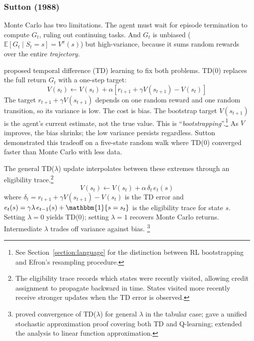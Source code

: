 \subsubsection{Sutton (1988)}

Monte Carlo has two limitations. The agent must wait for episode termination to compute $G_t$, ruling out continuing tasks. And $G_t$ is unbiased ($\mathbb{E}[G_t \mid S_t = s] = V^\pi(s)$) but high-variance, because it sums random rewards over the entire \textit{trajectory}.

\citet{sutton1988} proposed temporal difference (TD) learning to fix both problems. TD(0) replaces the full return $G_t$ with a one-step target:
\begin{equation}
V(s_t) \leftarrow V(s_t) + \alpha \left[ r_{t+1} + \gamma V(s_{t+1}) - V(s_t) \right]
\end{equation}
The target $r_{t+1} + \gamma V(s_{t+1})$ depends on one random reward and one random transition, so its variance is low. The cost is bias. The bootstrap target $V(s_{t+1})$ is the agent's current estimate, not the true value. This is ``\textit{bootstrapping}''.\footnote{See Section~\ref{section:language} for the distinction between RL bootstrapping and Efron's resampling procedure.} As $V$ improves, the bias shrinks; the low variance persists regardless. Sutton demonstrated this tradeoff on a five-state random walk where TD(0) converged faster than Monte Carlo with less data.

The general TD($\lambda$) update interpolates between these extremes through an eligibility trace.\footnote{The eligibility trace records which states were recently visited, allowing credit assignment to propagate backward in time. States visited more recently receive stronger updates when the TD error is observed.}
\begin{equation}
V(s_t) \leftarrow V(s_t) + \alpha \, \delta_t \, e_t(s)
\end{equation}
where $\delta_t = r_{t+1} + \gamma V(s_{t+1}) - V(s_t)$ is the TD error and $e_t(s) = \gamma \lambda \, e_{t-1}(s) + \mathbbm{1}\{s = s_t\}$ is the eligibility trace for state $s$. Setting $\lambda = 0$ yields TD(0); setting $\lambda = 1$ recovers Monte Carlo returns. Intermediate $\lambda$ trades off variance against bias. \footnote{\citet{dayan1992} proved convergence of TD($\lambda$) for general $\lambda$ in the tabular case; \citet{jaakkola1994} gave a unified stochastic approximation proof covering both TD and Q-learning; \citet{tsitsiklis1997} extended the analysis to linear function approximation.}

